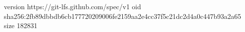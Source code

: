 version https://git-lfs.github.com/spec/v1
oid sha256:2fb89dbbdb6cb177720209006fe2159aa2e4cc37f5c21dc2d4a0c447b93a2a65
size 182831
